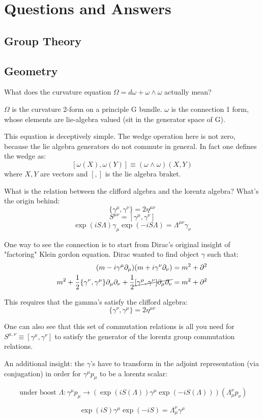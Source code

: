 \documentclass[11pt]{scrartcl}
\begin{document}
\section{Questions and Answers}
\subsection{Group Theory}
\subsection{Geometry}


\begin{myquestion}
	What does the curvature equation $\Omega = d \omega + \omega \wedge \omega$ actually mean?
	\end{myquestion}
$\Omega$ is the curvature 2-form on a principle G bundle.  $\omega$ is the connection 1 form, whose elements are lie-algebra valued (sit in the generator space of G).

This equation is deceptively simple.  The wedge operation here is not zero, because the lie algebra generators do not commute in general.  In fact one defines the wedge as:
\[ [\omega(X), \omega(Y) ] \equiv ( \omega \wedge \omega) (X, Y)\]
where $X, Y$ are vectors and $[,]$ is the lie algebra braket.

\begin{myquestion}
	What is the relation between the clifford algebra and the lorentz algebra?
	What's the origin behind:
	\[ \{ \gamma^\mu, \gamma^\nu \} = 2 \eta^{\mu \nu} \]
	\[ S^{\mu \nu}= [\gamma^\mu, \gamma^\nu] \]
	\[ \exp(i S \Lambda) \gamma_\mu \exp(-i S \Lambda)= \Lambda^{\mu \nu} \gamma_\nu \]
	\end{myquestion}

One way to see the connection is to start from Dirac's original insight of "factoring" Klein gordon equation.  Dirac wanted to find object $\gamma$ such that:
\begin{align}
	(m - i \gamma^\mu \partial_\mu) (m + i \gamma^\nu \partial_\nu) = m^2 + \partial^2 \\
	m^2 + \frac12 
	\{ \gamma^\nu, \gamma^\mu \}  \partial_\mu \partial_\nu + 
	\frac12 \cancel{[\gamma^\mu, \gamma^\nu] \partial_\mu \partial_\nu}= m^2 + \partial^2
	\end{align}

This requires that the gamma's satisfy the clifford algebra:
\[ \{ \gamma^\nu, \gamma^\mu \} = 2 \eta^{\mu \nu}\]

One can also see that this set of commutation relations is all you need  for $S^{\mu, \nu} \equiv [\gamma^\mu, \gamma^\nu]$ to satisfy the generator of the lorentz group commutation relations.

An additional insight:  the $\gamma$'s have to transform in the adjoint representation (via conjugation) in order for $\gamma^\mu p_\mu$ to be a lorentz scalar:

\[\text{ under boost } \Lambda: \gamma^\mu p_\mu \rightarrow  \left(\exp(i S(\Lambda)) \gamma^\mu \exp(- i S(\Lambda)) \right) \left( \Lambda^{\nu}_\mu p_\nu \right) \]

\[ \exp(i S) \gamma^\mu \exp(- i S) = \Lambda^{\nu}_\mu \gamma^\mu \]
\end{document}
